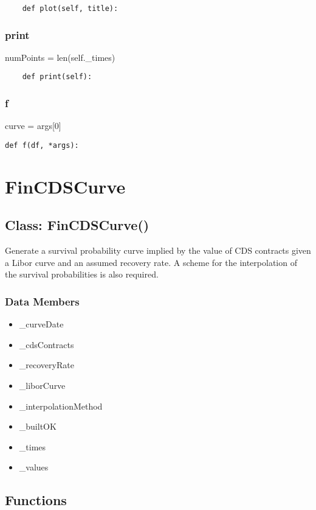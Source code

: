 \documentclass[twoside,11pt]{book}
\begin{document}
\begin{lstlisting}
    def plot(self, title):
\end{lstlisting}

\subsubsection*{{\bf print}}
numPoints = len(self.\_times) 

\begin{lstlisting}
    def print(self):
\end{lstlisting}

\subsubsection*{{\bf f}}
curve = args[0] 

\begin{lstlisting}
def f(df, *args):
\end{lstlisting}

\newpage
\section{FinCDSCurve}

\subsection*{Class: FinCDSCurve()}
Generate a survival probability curve implied by the value of CDS contracts given a Libor curve and an assumed recovery rate. A scheme for the interpolation of the survival probabilities is also required.  

\subsubsection*{Data Members}
\begin{itemize}
\item{\_curveDate}
\item{\_cdsContracts}
\item{\_recoveryRate}
\item{\_liborCurve}
\item{\_interpolationMethod}
\item{\_builtOK}
\item{\_times}
\item{\_values}
\end{itemize}

\subsection*{Functions}
\end{document}
